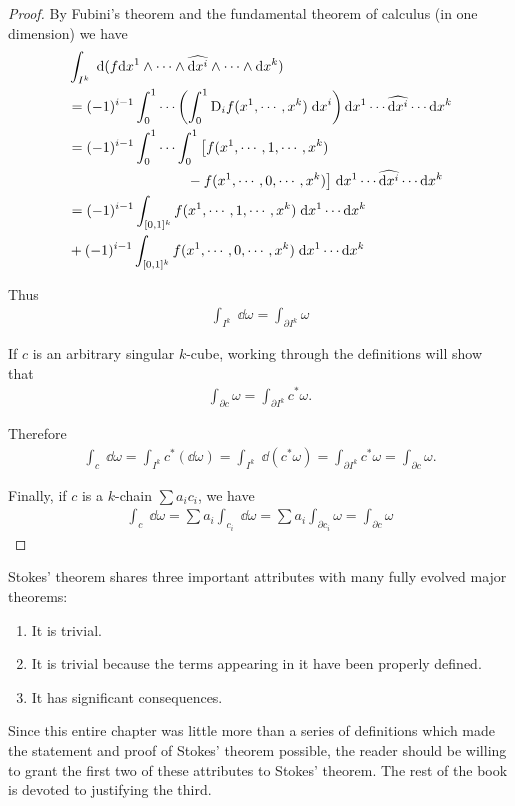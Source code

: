 \begin{proof}
    By Fubini's theorem and the fundamental theorem of calculus (in one dimension) we have
    \begin{align*}
        & \int_{I^{k}}\;\mathrm{d}(f \mathrm{d} x^1\wedge\cdots\wedge\widehat{\mathrm{d} x^i}\wedge\cdots\wedge \mathrm{d} x^k) \\
        & = (-1)^{i-1}\int_{0}^{1}\cdots\left(\int_{0}^{1}\mathrm{D}_{i}f(x^{1},\cdots,x^{k})\;\mathrm{d} x^{i}\right)\mathrm{d} x^{1}\cdots\widehat{\mathrm{d} x^i}\cdots\mathrm{d} x^k\\
        & = (-1)^{i-1}\int_{0}^{1}\cdots\int_{0}^{1}\big[f(x^{1},\cdots,1,\cdots,x^{k}) \\
        & \hspace*{8.5em} - f(x^{1},\cdots,0,\cdots,x^{k})\big]\;\mathrm{d} x^{1}\cdots\widehat{\mathrm{d} x^i}\cdots\mathrm{d} x^k\\
        & = (-1)^{i-1}\int_{[0,1]^k} f(x^1,\cdots,1,\cdots,x^k)\;\mathrm{d} x^1\cdots\mathrm{d} x^k \\
        & + (-1)^{i-1}\int_{[0,1]^k} f(x^1,\cdots,0,\cdots,x^k)\;\mathrm{d} x^1\cdots\mathrm{d} x^k
    \end{align*}

    Thus 
    \begin{align*}
        \int_{I^k}\;\dd\omega=\int_{\partial I^k}\omega
    \end{align*}

    If $c$ is an arbitrary singular $k$-cube, working through the definitions will show that
    \begin{align*}
        \int_{\partial c}\omega=\int_{\partial I^k}c^*\omega.
    \end{align*}

    Therefore 
    \begin{align*}
        \int_{c}\;\dd\omega
        = \int_{I^{k}}c^{*}(\dd\omega)
        = \int_{I^{k}}\;\dd(c^{*}\omega)
        = \int_{\partial I^{k}}c^{*}\omega
        = \int_{\partial c}\omega.
    \end{align*}

    Finally, if $c$ is a $k$-chain $\sum a_ic_i$, we have 
    \begin{align*}
        \int_c\;\dd\omega
        = \sum a_i\int_{c_i}\;\dd\omega
        = \sum a_i\int_{\partial c_i}\omega
        = \int_{\partial c}\omega 
    \end{align*}
\end{proof}

Stokes' theorem shares three important attributes with
many fully evolved major theorems:
\begin{enumerate}[label=\arabic*.]
    \item It is trivial. 
    \item It is trivial because the terms appearing in it have been properly defined.
    \item It has significant consequences.
\end{enumerate}
Since this entire chapter was little more than a series of definitions which made the 
statement and proof of Stokes' theorem possible, the reader should be willing to grant the
first two of these attributes to Stokes' theorem. The rest of the book is devoted to 
justifying the third.


